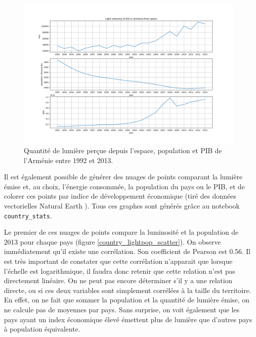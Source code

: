 \documentclass[a4paper, 11pt]{report}
\begin{document}
\begin{figure}
	\centering
	\includegraphics[width=1.0\textwidth]{img/sum_Armenia.png}
	\caption{Quantité de lumière perçue depuis l'espace, population et PIB de l'Arménie entre 1992 et 2013.}
	\label{sum_Armenia}
\end{figure}

Il est également possible de générer des nuages de points comparant la lumière émise et, au choix, l'énergie consommée, la population du pays ou le PIB, et de colorer ces points par indice de développement économique (tiré des données vectorielles Natural Earth \cite{naturalearthdata}). Tous ces graphes sont générés grâce au notebook \texttt{country\_stats}.

Le premier de ces nuages de points compare la luminosité et la population de 2013 pour chaque pays (figure \ref{country_lightpop_scatter}). On observe immédiatement qu'il existe une corrélation. Son coefficient de Pearson est 0.56. Il est très important de constater que cette corrélation n'apparait que lorsque l'échelle est logarithmique, il faudra donc retenir que cette relation n'est pas directement linéaire. On ne peut pas encore déterminer s'il y a une relation directe, ou si ces deux variables sont simplement corrélées à la taille du territoire. En effet, on ne fait que sommer la population et la quantité de lumière émise, on ne calcule pas de moyennes par pays.
Sans surprise, on voit également que les pays ayant un index économique élevé émettent plus de lumière que d'autres pays à population équivalente.
\end{document}
